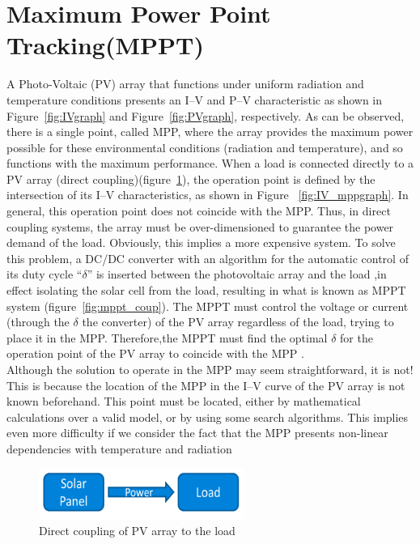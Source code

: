   
\section{Maximum Power Point Tracking(MPPT)}

A Photo-Voltaic (PV) array that functions under uniform radiation and temperature conditions presents an I–V and P–V characteristic as shown in Figure~\ref{fig:IVgraph} and Figure~\ref{fig:PVgraph}, respectively. As can be observed, there is a single point, called \ac{MPP}, where the array provides the maximum power possible for these environmental conditions (radiation and temperature), and so functions with the maximum performance. When a load is connected directly to a PV array (direct coupling)(figure~\ref{fig:direct_coupling}), the operation point is defined by the intersection of its I–V characteristics, as shown in Figure ~\ref{fig:IV_mppgraph}. In general, this operation point does not coincide with the \ac{MPP}. Thus, in direct coupling systems, the array must be over-dimensioned to guarantee the power demand of the load. Obviously, this implies a more expensive system. To solve this problem, a DC/DC  converter with an algorithm for the automatic control of its duty cycle “${\delta}$” is inserted between the photovoltaic array and the load ,in effect isolating the solar cell from the load, resulting in what is known as \ac{MPPT} system (figure~\ref{fig:mppt_coup}). The \ac{MPPT} must control the voltage or current (through the ${\delta}$ the converter) of the PV array regardless of the load, trying to place it in the \ac{MPP}. Therefore,the \ac{MPPT} must find the optimal ${\delta}$ for the operation point of the PV array to coincide with the \ac{MPP} \cite{enrique2010reliable}.\\

Although the solution to operate in the \ac{MPP} may seem straightforward, it is not! This is because the location of the \ac{MPP} in the I–V curve of the PV array is not known beforehand. This point must be located, either by mathematical calculations over a valid model, or by using some search algorithms. This implies even more difficulty if we consider the fact that the \ac{MPP} presents non-linear dependencies with temperature and radiation\cite{enrique2010reliable}\\
 
 \begin{figure}[H]
  \begin{center}
  \includegraphics[width=0.6\textwidth]{images/direct_coupling}
  \caption{Direct coupling of PV array to the load}
  \label{fig:direct_coupling}
  \end{center}
  \end{figure}

